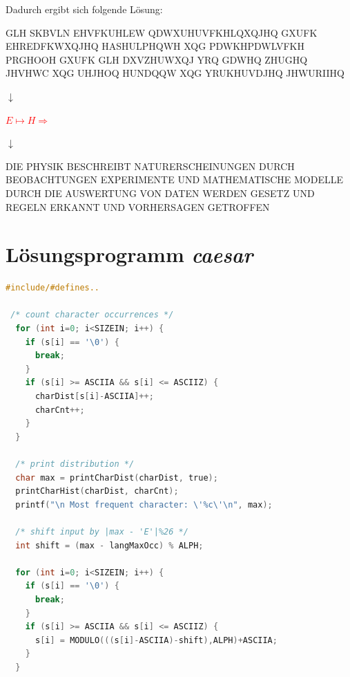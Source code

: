 \documentclass[a4paper]{article}
\begin{document}
\bigskip
\par Dadurch ergibt sich folgende Lösung:

GLH SKBVLN EHVFKUHLEW QDWXUHUVFKHLQXQJHQ GXUFK EHREDFKWXQJHQ HASHULPHQWH XQG PDWKHPDWLVFKH PRGHOOH GXUFK GLH DXVZHUWXQJ YRQ GDWHQ ZHUGHQ JHVHWC XQG UHJHOQ HUNDQQW XQG YRUKHUVDJHQ JHWURIIHQ
\medskip
\begin{center}
$\downarrow$
\end{center}
\medskip
\textcolor{red}{$E \mapsto H \Rightarrow$}
\medskip
\begin{center}
$\downarrow$
\end{center}
\medskip
DIE PHYSIK BESCHREIBT NATURERSCHEINUNGEN DURCH BEOBACHTUNGEN EXPERIMENTE UND MATHEMATISCHE MODELLE DURCH DIE AUSWERTUNG VON DATEN WERDEN GESETZ UND REGELN ERKANNT UND VORHERSAGEN GETROFFEN
\clearpage

\appendix
\section{Lösungsprogramm \textit{caesar}}
\label{appA.sec.caesar}
\bigskip
\begin{mdframed}[style=mdstyle]
\begin{lstlisting}[language=C, caption=caesar.c]
#include/#defines..

 /* count character occurrences */
  for (int i=0; i<SIZEIN; i++) {
    if (s[i] == '\0') {
      break;
    }   
    if (s[i] >= ASCIIA && s[i] <= ASCIIZ) {
      charDist[s[i]-ASCIIA]++;
      charCnt++;
    }   
  }
  
  /* print distribution */
  char max = printCharDist(charDist, true);
  printCharHist(charDist, charCnt);
  printf("\n Most frequent character: \'%c\'\n", max);
  
  /* shift input by |max - 'E'|%26 */
  int shift = (max - langMaxOcc) % ALPH;

  for (int i=0; i<SIZEIN; i++) {
    if (s[i] == '\0') {
      break;
    }   
    if (s[i] >= ASCIIA && s[i] <= ASCIIZ) {
      s[i] = MODULO(((s[i]-ASCIIA)-shift),ALPH)+ASCIIA;
    }   
  }
\end{lstlisting}
\end{mdframed}
\end{document}
